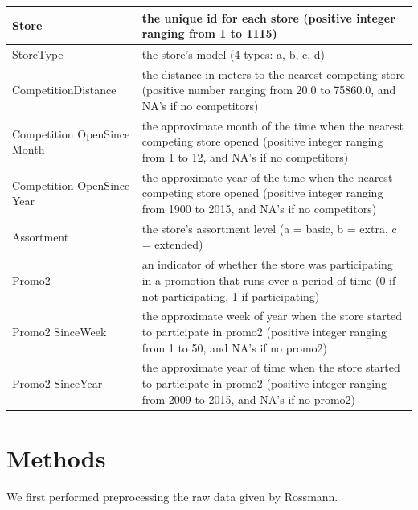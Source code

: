\documentclass[letterpaper,twocolumn,11pt]{article}
\begin{document}
\begin{tabular}{| L{2cm} | L{5cm} |}
  \hline
  Store & the unique id for each store (positive integer ranging from 1 to 1115) \\ \hline
  StoreType & the store's model (4 types: a, b, c, d) \\ \hline
  CompetitionDistance & the distance in meters to the nearest competing store (positive number ranging from 20.0 to 75860.0, and NA's if no competitors) \\ \hline
  Competition OpenSince Month & the approximate month of the time when the nearest competing store opened (positive integer ranging from 1 to 12, and NA's if no competitors) \\ \hline
  Competition OpenSince Year & the approximate year of the time when the nearest competing store opened (positive integer ranging from 1900 to 2015, and NA's if no competitors) \\ \hline
  Assortment & the store's assortment level (a = basic, b = extra, c = extended) \\ \hline
  Promo2 & an indicator of whether the store was participating in a promotion that runs over a period of time  (0 if not participating, 1 if participating) \\ \hline
  Promo2 SinceWeek & the approximate week of year when the store started to participate in promo2 (positive integer ranging from 1 to 50, and NA's if no promo2) \\ \hline
  Promo2 SinceYear & the approximate year of time when the store started to participate in promo2 (positive integer ranging from 2009 to 2015, and NA's if no promo2) \\ \hline
\end{tabular}

\section{Methods}
We first performed preprocessing the raw data given by Rossmann.
\end{document}
